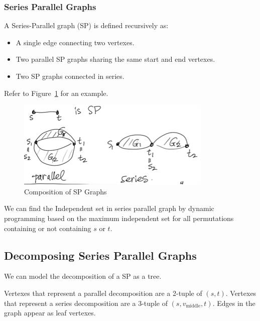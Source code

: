                     \subsubsection{Series Parallel Graphs} %
                    \label{ssub:series_parallel_graphs}
                        A Series-Parallel graph (SP) is defined recursively as:
                        \begin{itemize}
                            \item A single edge connecting two vertexes.
                            \item Two parallel SP graphs sharing the same start and end vertexes.
                            \item Two SP graphs connected in series.
                        \end{itemize}
                        Refer to Figure~\ref{fig:sp_composition} for an example.
                        \begin{figure}[h]
                            \centering
                            \includegraphics{images/sp_composition.png}
                            \caption{Composition of SP Graphs}
                            \label{fig:sp_composition}
                        \end{figure}
                        We can find the Independent set in series parallel graph by dynamic programming based on the maximum independent set for all permutations containing or not containing $s$ or $t$.
                    \subsection{Decomposing Series Parallel Graphs} %
                    \label{sub:decomposing_series_parallel_graphs}
                        We can model the decomposition of a SP as a tree.

                        Vertexes that represent a parallel decomposition are a 2-tuple of $(s, t)$.
                        Vertexes that represent a series decomposition are a 3-tuple of $(s, v_\text{middle}, t)$.
                        Edges in the graph appear as leaf vertexes.

